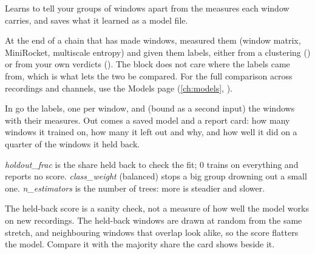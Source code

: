 Learns to tell your groups of windows apart from the measures each window carries, and saves
what it learned as a model file.

At the end of a chain that has made windows, measured them (window matrix, MiniRocket,
multiscale entropy) and given them labels, either from a clustering
() or from your own verdicts ().
The block does not care where the labels came from, which is what lets the two be compared.
For the full comparison across recordings and channels, use the Models page
(\cref{ch:models}, ).

In go the labels, one per window, and (bound as a second input) the windows with their
measures. Out comes a saved model and a report card: how many windows it trained on, how
many it left out and why, and how well it did on a quarter of the windows it held back.

\emph{holdout\_frac} is the share held back to check the fit; 0 trains on everything and
reports no score. \emph{class\_weight} (balanced) stops a big group drowning out a small one.
\emph{n\_estimators} is the number of trees: more is steadier and slower.

The held-back score is a sanity check, not a measure of how well the model works on new
recordings. The held-back windows are drawn at random from the same stretch, and neighbouring
windows that overlap look alike, so the score flatters the model. Compare it with the
majority share the card shows beside it.
